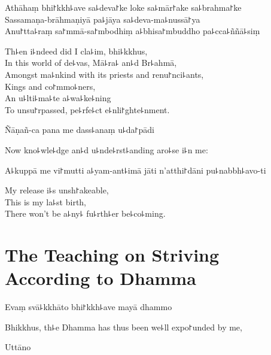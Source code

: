 Athāhaṃ bhi꜓kkh꜕ave sa꜕deva꜓ke loke sa꜕mār꜓ake sa꜕brahma꜓ke\\
Sassamaṇa-brāhmaṇiyā pa꜕jāya sa꜕deva-ma꜕nussā꜓ya\\
Anu꜓tta꜕raṃ sa꜓mmā-sa꜓mbodhiṃ a꜕bhisa꜓mbuddho pa꜕cca꜕ññā꜕siṃ

\begin{english}
  Th꜕en i꜕ndeed did I cla꜕im, bhi꜕kkhus,\\
  In this world of de꜕vas, Mā꜕ra꜕ an꜕d Br꜕ahmā,\\
  Amongst ma꜕nkind with its priests and renu꜓nci꜕ants,\\
  Kings and co꜓mmo꜕ners,\\
  An u꜕lti꜕ma꜕te a꜕wa꜕ke꜕ning\\
  To unsu꜓rpassed, pe꜕rfe꜕ct e꜕nli꜓ghte꜕nment.
\end{english}

Ñāṇañ-ca pana me dass꜕anaṃ u꜕da꜓pādi

\begin{english}
  Now kno꜕wle꜕dge an꜕d u꜕nde꜕rst꜕anding aro꜕se i꜕n me:
\end{english}

A꜕kuppā me vi꜓mutti a꜕yam-ant꜕imā jāti n'atthi꜓dāni pu꜕nabbh꜕avo-ti

\begin{english}
  My release i꜕s unsh꜓akeable,\\
  This is my la꜕st birth,\\
  There won't be a꜕ny꜕ fu꜕rth꜕er be꜕co꜕ming.
\end{english}

\chapter[Striving According to Dhamma]{The Teaching on Striving According to Dhamma}%


\begin{leader}
\end{leader}

Evaṃ svā꜕kkhāto bhi꜓kkh꜕ave mayā dhammo

\begin{english}
  Bhikkhus, th꜕e Dhamma has thus been we꜕ll expo꜓unded by me,
\end{english}

Uttāno


